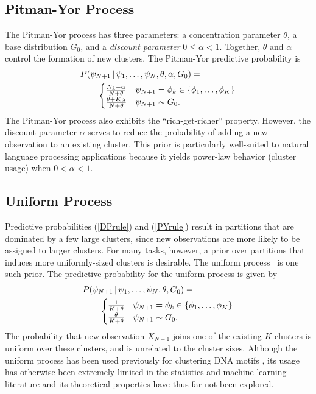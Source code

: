 \documentclass[twoside]{article}
\begin{document}
\subsection{Pitman-Yor Process}

The Pitman-Yor process \cite[]{PitYor97} has three parameters: a
concentration parameter $\theta$, a base distribution $G_0$, and a
\emph{discount parameter} $0 \le \alpha < 1$. Together, $\theta$ and
$\alpha$ control the formation of new clusters. The Pitman-Yor
predictive probability is
\begin{align}
&P(\psi_{N+1} \,|\, \psi_1, \ldots, \psi_N, \theta, \alpha, G_0) = \notag \\
&\qquad \begin{cases}
\frac{N_k-\alpha}{N + \theta} & \psi_{N+1} = \phi_k \in \{ \phi_1,
\ldots, \phi_K \}\\
\frac{\theta + K \alpha}{N + \theta} & \psi_{N+1} \sim G_0.\label{PYrule}
\end{cases}
\end{align}
The Pitman-Yor process also exhibits the ``rich-get-richer''
property. However, the discount parameter $\alpha$ serves to reduce
the probability of adding a new observation to an existing cluster.
This prior is particularly well-suited to natural language processing
applications \cite[]{Teh06, Wallach08} because it yields power-law
behavior (cluster usage) when $0 < \alpha < 1$.

\subsection{Uniform Process}

Predictive probabilities (\ref{DPrule}) and (\ref{PYrule}) result in
partitions that are dominated by a few large clusters, since new
observations are more likely to be assigned to larger clusters. For
many tasks, however, a prior over partitions that induces more
uniformly-sized clusters is desirable. The uniform
process~\cite[]{QinMcCTho03,JenLiu08} is one such prior. The
predictive probability for the uniform process is given by
\begin{align}
&P(\psi_{N+1} \,|\, \psi_1, \ldots, \psi_N, \theta, G_0) = \notag \\
&\qquad \begin{cases}
\frac{1}{K + \theta} & \psi_{N + 1} = \phi_k \in \{ \phi_1, \ldots,
\phi_K \}\\
\frac{\theta}{K + \theta} & \psi_{N+1} \sim G_0.\label{UPrule}
\end{cases}
\end{align}
The probability that new observation $X_{N+1}$ joins one of the
existing $K$ clusters is uniform over these clusters, and is unrelated
to the cluster sizes. Although the uniform process has been used
previously for clustering DNA motifs \cite[]{QinMcCTho03,JenLiu08},
its usage has otherwise been extremely limited in the statistics and
machine learning literature and its theoretical properties have
thus-far not been explored.
\end{document}
